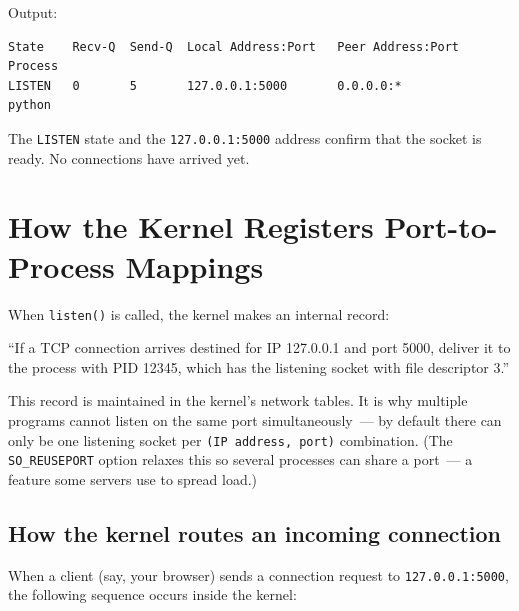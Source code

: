 \noindent{}Output:

\begin{outputbox}[short]
\begin{Verbatim}[fontsize=\codesize, breaklines, breakanywhere, breaksymbolleft={\tiny\textcolor{muted}{$\hookrightarrow$}}]
State    Recv-Q  Send-Q  Local Address:Port   Peer Address:Port  Process
LISTEN   0       5       127.0.0.1:5000       0.0.0.0:*          python
\end{Verbatim}
\end{outputbox}

\noindent{}The \texttt{LISTEN} state and the \texttt{127.0.0.1:5000} address confirm that the socket is ready. No connections have arrived yet.

\setcounter{section}{4}
\section{How the Kernel Registers Port-to-Process Mappings}\label{03-network-capability:35-how-the-kernel-registers-port-to-process-mappings}

When \texttt{listen()} is called, the kernel makes an internal record:

\begin{notebox}

``If a TCP connection arrives destined for IP 127.0.0.1 and port 5000, deliver it to the process with PID 12345, which has the listening socket with file descriptor 3.''

\end{notebox}

\noindent{}This record is maintained in the kernel's network tables. It is why multiple programs cannot listen on the same port simultaneously~--- by default there can only be one listening socket per \texttt{(IP\ address,}\allowbreak{}\texttt{\ port)} combination. (The \texttt{SO\_REUSEPORT} option relaxes this so several processes can share a port~--- a feature some servers use to spread load.)

\subsection*{How the kernel routes an incoming connection}\label{03-network-capability:how-the-kernel-routes-an-incoming-connection}

When a client (say, your browser) sends a connection request to \texttt{127.0.0.1:5000}, the following sequence occurs inside the kernel:

